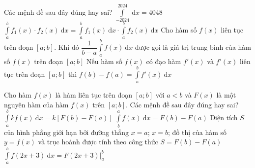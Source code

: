 \begin{ex}%
Các mệnh đề sau đây đúng hay sai?
\choiceTF
{\True $\displaystyle\int\limits_{-2024}^{2024}\mathrm{~d}x=4048$}
{$\displaystyle\int\limits_a^bf_1(x)\cdot f_2(x)\mathrm{~d}x=\displaystyle\int\limits_a^bf_1(x)\mathrm{~d}x\cdot\displaystyle\int\limits_a^bf_2(x)\mathrm{~d}x$}
{\True Cho hàm số $f(x)$ liên tục trên đoạn $\left[a;b\right]$. Khi đó $\dfrac{1}{b-a}\displaystyle\int\limits_a^bf(x)\mathrm{~d}x$ được gọi là giá trị trung bình của hàm số $f(x)$ trên đoạn $\left[a;b\right]$}
{\True Nếu hàm số $f(x)$ có đạo hàm $f'(x)$ và $f'(x)$ liên tục trên đoạn $\left[a;b\right]$ thì $f(b)-f(a)=\displaystyle\int\limits_a^bf'(x)\mathrm{~d}x$}
\end{ex}
%
\begin{ex}%
Cho hàm $ f(x)$ là hàm liên tục trên đoạn $\left[a;b\right]$ với $ a<b$ và $F(x)$ là một nguyên hàm của hàm $ f(x)$ trên $\left[a;b\right]$. Các mệnh đề sau đây đúng hay sai?
\choiceTF
{\True $\displaystyle\int\limits_a^b{kf(x)\mathrm{~d}x}=k\left[F(b)-F(a)\right]$}
{$\displaystyle\int\limits_b^af(x)\mathrm{~d}x=F(b)-F(a)$}
{Diện tích $S$ của hình phẳng giới hạn bởi đường thẳng $x=a$; $x=b$; đồ thị của hàm số $ y=f(x)$ và trục hoành được tính theo công thức $ S=F(b)-F(a)$}
{$\displaystyle\int\limits_a^b{f\left(2x+3\right)\mathrm{~d}x}=F\left(2x+3\right)\big|_a^b$}
\end{ex}
%

